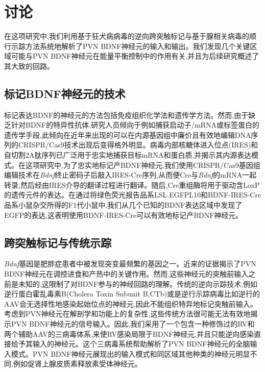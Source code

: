 \chapter{讨论}\label{chap:discussion}
在这项研究中,我们利用基于狂犬病病毒的逆向跨突触标记与基于腺相关病毒的顺行示踪方法系统地解析了PVN BDNF神经元的输入和输出。我们发现几个关键区域可能与PVN BDNF神经元在能量平衡控制中的作用有关,并且为后续研究概述了其大致的回路。

\section{标记BDNF神经元的技术}
标记表达BDNF的神经元的方法包括免疫组织化学法和遗传学方法。然而,由于缺乏针对BDNF的特异性抗体,研究人员倾向于例如捕获启动子/mRNA或标签蛋白的遗传学手段,此倾向在近年来出现的可以在内源基因组中廉价且有效地编辑DNA序列的CRISPR/Cas9技术\citep{ran2013genome,doudna2014new}出现后变得格外明显。病毒内部核糖体进入位点(IRES)和自切割2A肽序列已广泛用于忠实地捕获目标mRNA和蛋白质,并揭示其内源表达模式\citep{vong2011leptin,daigle2018suite}。在这项研究中,为了忠实地标记产BDNF神经元,我们使用CRISPR/Cas9基因组编辑技术在\textit{Bdnf}终止密码子后敲入IRES-Cre序列,从而便Cre与\textit{Bdnf}的mRNA一起转录,然后经由IRES介导的翻译过程进行翻译。随后,Cre重组酶将用于驱动含LoxP的遗传元件的表达。在通过将绿色荧光报告品系LSL.EGFPL10和BDNF-IRES-Cre品系小鼠杂交所得的F1代小鼠中,我们从几个已知的BDNF表达区域中发现了EGFP的表达,这表明使用BDNF-IRES-Cre可以有效地标记产BDNF神经元。

\section{跨突触标记与传统示踪}
\textit{Bdnf}基因是肥胖症患者中被发现突变最频繁的基因之一。近来的证据揭示了PVN BDNF神经元在调控进食和产热中的关键作用。然而,这些神经元的突触前输入之前是未知的,这限制了对BDNF参与的神经回路的理解。传统的逆向示踪技术,例如逆行蛋白霍乱毒素B(Cholera Toxin Subunit B,CTb)\citep{conte2009multiple}或是逆行示踪病毒比如逆行的AAV\citep{tervo2016designer}会无选择性地感染起始位点的神经元,因此不能组织特异地标记突触前输入。考虑到PVN神经元在解剖学和功能上的复杂性,这些传统方法很可能无法有效地揭示PVN BDNF神经元的信号输入。因此,我们采用了一个包含一种修饰过的RV和两个辅助AAV的三病毒体系,来使RV感染局限于BDNF神经元,并且只能逆向感染直接给予其输入的神经元。这个三病毒系统帮助解析了PVN BDNF神经元的全脑输入模式。PVN BDNF神经元展现出的输入模式和同区域其他种类的神经元明显不同,例如促肾上腺皮质素释放素受体神经元\citep{jiang2018local}。

